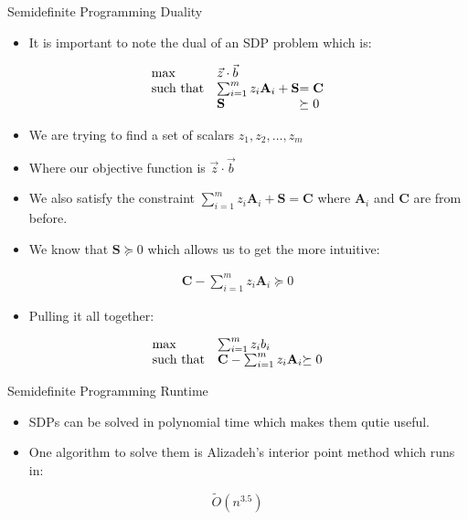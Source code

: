 \documentclass[
	11pt, %
]{beamer}
\begin{document}
\begin{frame}[label={sec:org94c0d68}]{Semidefinite Programming Duality}
\begin{itemize}
\item It is important to note the dual of an SDP problem which is:
\end{itemize}
\begin{align*}
  \begin{array}{ll@{}ll}
    \max              & \vec{z} \cdot \vec{b}                              & \\
    \text{such that}  & \sum_{i=1}^m z_i \mathbf{A}_{i} + \mathbf{S} &= \mathbf{C} \\
                    & \mathbf{S}                      &\succeq 0
  \end{array}
\end{align*}
\pause
\begin{itemize}
\item We are trying to find a set of scalars \(z_1, z_2, \ldots, z_m\)
\item Where our objective function is \(\vec{z} \cdot \vec{b}\)
\item We also satisfy the constraint \(\sum_{i=1}^m z_i \mathbf{A}_{i} + \mathbf{S} = \mathbf{C}\) where \(\mathbf{A}_i\) and \(\mathbf{C}\) are from before.
\end{itemize}
\pause
\begin{itemize}
\item We know that \(\mathbf{S} \succeq 0\) which allows us to get the more intuitive:
\end{itemize}
\begin{align*}
\mathbf{C} - \sum_{i = 1}^m z_i \mathbf{A}_i \succeq 0
\end{align*}

\begin{itemize}
\item Pulling it all together:
\end{itemize}
\begin{align*}
  \begin{array}{ll@{}ll}
    \max              & \sum_{i=1}^m z_i b_i                              & \\
    \text{such that}  & \mathbf{C} - \sum_{i = 1}^m z_i \mathbf{A}_i &\succeq 0 \\
  \end{array}
\end{align*}
\end{frame}

\begin{frame}[label={sec:org25d1b18}]{Semidefinite Programming Runtime}
\begin{itemize}
\item SDPs can be solved in polynomial time which makes them qutie useful.
\item One algorithm to solve them is Alizadeh's interior point method which runs in:
\end{itemize}
\[
\tilde{O}(n^{3.5})
\]
\end{frame}
\end{document}
